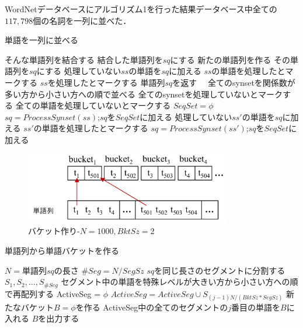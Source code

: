 \documentclass[master]{suribt}
\theoremstyle{definition}
\begin{document}
 WordNetデータベースにアルゴリズム1を行った結果データベース中全ての$117,798$個の名詞を一列に並べた．

 \begin{algorithm}
 \caption{単語を一列に並べる}
 \begin{algorithmic}[1]
   \State そんな単語列を結合する
   \State 結合した単語列を$sq$にする
   \State 新たの単語列を作る
   \State その単語列を$sq$にする
  \EndIf
  \State 処理していない$ss$の単語を$sq$に加える
  \State $ss$の単語を処理したとマークする
  \State $ss$を処理したとマークする
  \State 単語列$sq$を返す　
 \EndFunction
  \State 全てのsynsetを関係数が多い方から小さい方への順で並べる
  \State 全てのsynsetを処理していないとマークする
  \State 全ての単語を処理していないとマークする
  \State $SeqSet = \phi$
   \State $sq=ProcessSynset(ss)$;$sq$を$SeqSet$に加える
    \State 処理していない$ss'$の単語を$sq$に加える
    \State $ss'$の単語を処理したとマークする
    \State $sq=ProcessSynset(ss')$;$sq$を$SeqSet$に加える　
   \EndFor
  \EndFor
 \EndFunction
 \end{algorithmic}
 \label{a:bkt}
 \end{algorithm}

 \begin{figure}[!hbp]
  \centering
  \includegraphics[width=0.8\textwidth,natwidth=5677,natheight=1982]{rk11.png}
  \caption{バケット作り-$N=1000,BktSz=2$}\label{fig:bkt}
 \end{figure}

 \begin{algorithm}
 \caption{単語列から単語バケットを作る}
 \begin{algorithmic}[1]
  \State $N=$単語列$sq$の長さ
  \State $\#Seg=N/SegSz$
  \State $sq$を同じ長さのセグメントに分割する$S_1,S_2, \dots , S_{\#Seg}$
  \State セグメント中の単語を特殊レベルが大きい方から小さい方への順で再配列する
   \State ActiveSeg = $\phi$
    \State $ActiveSeg = ActiveSeg \cup S_{(j-1)N/(BktSz * SegSz)}$
   \EndFor
    \State 新たなバケット$B=\phi$を作る
    \State ActiveSeg中の全てのセグメントの$j$番目の単語を$B$に入れる
    \State $B$を出力する
   \EndFor
  \EndFor
 \EndFunction
 \end{algorithmic}
 \label{a:bkt2}
 \end{algorithm}
 
\end{document}
